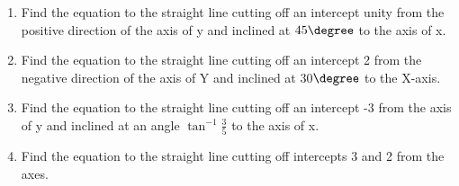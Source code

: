 \renewcommand{\theequation}{\theenumi}
\renewcommand{\thefigure}{\theenumi}
\begin{enumerate}[label=\thesubsection.\arabic*.,ref=\thesubsection.\theenumi]
%
\item Find the equation to the straight line cutting off an intercept unity from the positive direction of the
axis of y and inclined at $45\degree$   to the axis of x.
\\
\solution

%
\item Find the equation to the straight line cutting off an intercept 2 from the negative direction of the axis of Y and inclined at 30$\degree$ to the X-axis.
\\
\solution


\item Find the equation to the straight line cutting off an intercept -3 from the axis of y and inclined at an angle $\tan^{-1}\frac{3}{5}$ to the axis of x.
%
\\
\solution



\item Find the equation to the straight line cutting off intercepts 3 and 2 from the axes.
%
\\
\solution

\end{enumerate}
